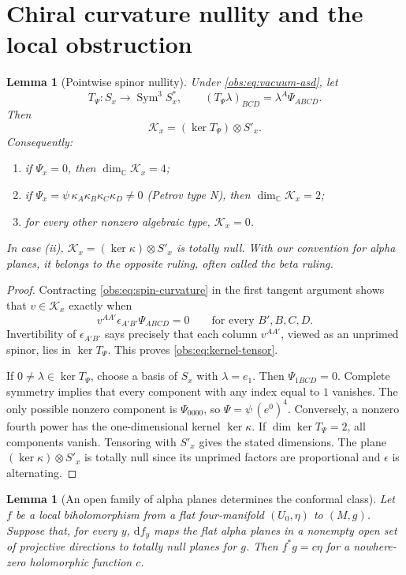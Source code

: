 \documentclass[11pt]{article}
\newtheorem{lemma}[theorem]{Lemma}
\theoremstyle{definition}
\theoremstyle{remark}
\newcommand{\C}{\mathbb C}
\newcommand{\Sym}{\operatorname{Sym}}
\newcommand{\dd}{\mathrm d}
\begin{document}
\section{Chiral curvature nullity and the local obstruction}

\begin{lemma}[Pointwise spinor nullity]\label{obs:lem:spinor-nullity}
Under \eqref{obs:eq:vacuum-asd}, let
\[
 T_\Psi:S_x\longrightarrow\Sym^3S_x^*,
 \qquad (T_\Psi\lambda)_{BCD}=\lambda^A\Psi_{ABCD}.
\]
Then
\begin{equation}\label{obs:eq:kernel-tensor}
 \mathcal K_x=(\ker T_\Psi)\otimes S'_x.
\end{equation}
Consequently:
\begin{enumerate}[label=\textup{(\roman*)}]
\item if $\Psi_x=0$, then $\dim_\C\mathcal K_x=4$;
\item if $\Psi_x=\psi\,\kappa_A\kappa_B\kappa_C\kappa_D\ne0$
      (Petrov type N), then $\dim_\C\mathcal K_x=2$;
\item for every other nonzero algebraic type, $\mathcal K_x=0$.
\end{enumerate}
In case \textup{(ii)}, $\mathcal K_x=(\ker\kappa)\otimes S'_x$ is totally
null. With our convention for alpha planes, it belongs to the opposite
ruling, often called the beta ruling.
\end{lemma}

\begin{proof}
Contracting \eqref{obs:eq:spin-curvature} in the first tangent argument
shows that $v\in\mathcal K_x$ exactly when
\[
 v^{AA'}\epsilon_{A'B'}\Psi_{ABCD}=0
 \qquad\text{for every }B',B,C,D.
\]
Invertibility of $\epsilon_{A'B'}$ says precisely that each column
$v^{AA'}$, viewed as an unprimed spinor, lies in $\ker T_\Psi$.
This proves \eqref{obs:eq:kernel-tensor}.

If $0\ne\lambda\in\ker T_\Psi$, choose a basis of $S_x$ with
$\lambda=e_1$. Then $\Psi_{1BCD}=0$. Complete symmetry implies that every
component with any index equal to $1$ vanishes. The only possible nonzero
component is $\Psi_{0000}$, so $\Psi=\psi\,(e^0)^4$. Conversely, a nonzero
fourth power has the one-dimensional kernel $\ker\kappa$. If
$\dim\ker T_\Psi=2$, all components vanish. Tensoring with $S'_x$ gives
the stated dimensions. The plane $(\ker\kappa)\otimes S'_x$ is totally
null since its unprimed factors are proportional and $\epsilon$ is
alternating.
\end{proof}

\begin{lemma}[An open family of alpha planes determines the conformal class]
\label{obs:lem:alpha-conformal}
Let $f$ be a local biholomorphism from a flat four-manifold $(U_0,\eta)$
to $(M,g)$. Suppose that, for every $y$, $\dd f_y$ maps the flat alpha
planes in a nonempty open set of projective directions to totally null
planes for $g$. Then $f^*g=c\eta$ for a nowhere-zero holomorphic function
$c$.
\end{lemma}
\end{document}
